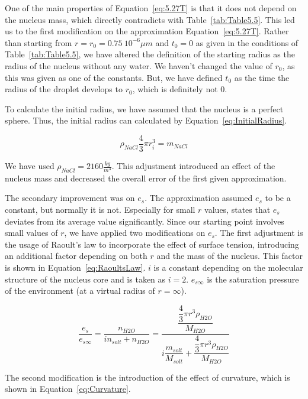 \documentclass[]{article}
\begin{document}
One of the main properties of Equation~\eqref{eq:5.27T} is that it does not
depend on the nucleus mass, which directly contradicts with Table~\ref{tab:Table5.5}. This led us to the first modification on the
approximation Equation~\eqref{eq:5.27T}. Rather than starting from $r=r_{0}=0.75\ 10^{-6} \mu m$
and $t_{0}=0$ as given in the conditions of Table~\ref{tab:Table5.5}, we have altered the definition of the starting radius as the
radius of the nucleus without any water. We haven't changed the value of
$r_{0}$, as this was given as one of the constants. But, we have defined
$t_{0}$ as the time the radius of the droplet develops to $r_{0}$, which is
definitely not $0$.

To calculate the initial radius, we have assumed that the nucleus is a perfect
sphere. Thus, the initial radius can calculated by
Equation~\eqref{eq:InitialRadius}.

\begin{equation} \label{eq:InitialRadius}
    \rho_{NaCl}\frac{4}{3}\pi r_{i}^{3}=m_{NaCl}
\end{equation}

We have used $\rho_{NaCl}=2160 \frac{kg}{m^{3}}$. This adjustment introduced an
effect of the nucleus mass and decreased the overall error of the first given approximation.

The secondary improvement was on $e_{s}$. The approximation assumed $e_{s}$ to
be a constant, but normally it is not. Especially for small $r$ values,
\cite{Best} states that $e_{s}$ deviates from its average value significantly. Since our starting point involves small values of $r$, we have applied two modifications on $e_{s}$. The first adjustment is the usage
of Raoult's law to incorporate the effect of surface tension, introducing an
additional factor depending on both $r$ and the mass of the nucleus. This
factor is shown in Equation~\eqref{eq:RaoultsLaw}. $i$ is a constant depending
on the molecular structure of the nucleus core and is taken as $i=2$. $e_{s\infty}$ is the saturation pressure of the environment (at a virtual radius of $r=\infty$).

\begin{equation}
    \label{eq:RaoultsLaw}
    \dfrac{e_{s}}{e_{s\infty}}=\dfrac{n_{H2O}}{i n_{solt}+n_{H2O}}=\dfrac{\dfrac{\dfrac{4}{3}\pi r^{3} \rho_{H2O}}{M_{H2O}}}{i \dfrac{m_{solt}}{M_{solt}} + \dfrac{\dfrac{4}{3}\pi r^{3} \rho_{H2O}}{M_{H2O}}}
\end{equation}

The second modification is the introduction of the effect of curvature, which
is shown in Equation~\eqref{eq:Curvature}.
\end{document}
